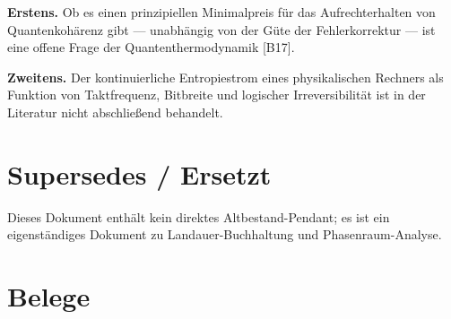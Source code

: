 \textbf{Erstens.} Ob es einen prinzipiellen Minimalpreis für das Aufrechterhalten
von Quantenkohärenz gibt --- unabhängig von der Güte der Fehlerkorrektur --- ist
eine offene Frage der Quantenthermodynamik [B17].

\textbf{Zweitens.} Der kontinuierliche Entropiestrom eines physikalischen Rechners
als Funktion von Taktfrequenz, Bitbreite und logischer Irreversibilität ist in der
Literatur nicht abschließend behandelt.

\section{Supersedes / Ersetzt}

Dieses Dokument enthält kein direktes Altbestand-Pendant; es ist ein
eigenständiges Dokument zu Landauer-Buchhaltung und Phasenraum-Analyse.

\clearpage
{}
{}
\section*{Belege}

